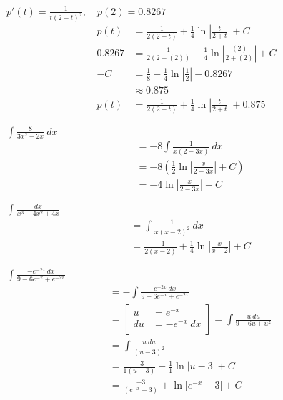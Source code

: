 \documentclass[12pt]{article}
\newenvironment{problem}[2][]{
    \begin{trivlist}
        \item[
            {\bfseries #1}
            {\bfseries #2.}
        ]
}{\end{trivlist}}
\newcommand{\subu}[2]{
\left[
\begin{alignedat}{1}
u &= #1 \\
du &= #2 \\
\end{alignedat}
\right] 
}
\begin{document}
\begin{problem}{32}
$p'(t) = \frac{1}{t(2 + t)^2}, \quad p(2) = 0.8267$
\begin{align}
p(t) &= \frac{1}{2(2 + t)} + \frac{1}{4} \ln\left|\frac{t}{2 + t}\right| + C \\
0.8267 &= \frac{1}{2(2 + (2))} + \frac{1}{4} \ln\left|\frac{(2)}{2 + (2)}\right| + C \\
-C &= \frac{1}{8} + \frac{1}{4} \ln\left|\frac{1}{2}\right| - 0.8267 \\
&\approx 0.875 \\
p(t) &= \frac{1}{2(2 + t)} + \frac{1}{4} \ln\left|\frac{t}{2 + t}\right| + 0.875
\end{align}
\end{problem}

\begin{problem}{33}
$\displaystyle\int \frac{8}{3x^2 - 2x} ~ dx$
\begin{align}
&= -8 \int \frac{1}{x(2 - 3x)} ~ dx \\
&= -8 \left(\frac{1}{2} \ln\left|\frac{x}{2 - 3x}\right| + C\right) \\
&= -4 \ln\left|\frac{x}{2 - 3x}\right| + C
\end{align}
\end{problem}

\begin{problem}{35}
$\displaystyle\int \frac{dx}{x^3 - 4x^2 + 4x}$
\begin{align}
&= \int \frac{1}{x(x - 2)^2} ~ dx \\
&= \frac{-1}{2(x - 2)} + \frac{1}{4} \ln\left|\frac{x}{x - 2}\right| + C
\end{align}
\end{problem}

\begin{problem}{37}
$\displaystyle\int \frac{-e^{-2x} ~ dx}{9 - 6e^{-x} + e^{-2x}}$
\begin{align}
&= - \int \frac{e^{-2x} ~ dx}{9 - 6e^{-x} + e^{-2x}} \\
&= \subu{e^{-x}}{-e^{-x} ~ dx} = \int \frac{u ~ du}{9 - 6u + u^2} \\
&= \int \frac{u ~ du}{(u - 3)^2} \\
&= \frac{-3}{1(u - 3)} + \frac{1}{1} \ln\left|u - 3\right| + C \\
&= \frac{-3}{(e^{-x} - 3)} + \ln\left|e^{-x} - 3\right| + C
\end{align}
\end{problem}
\end{document}
